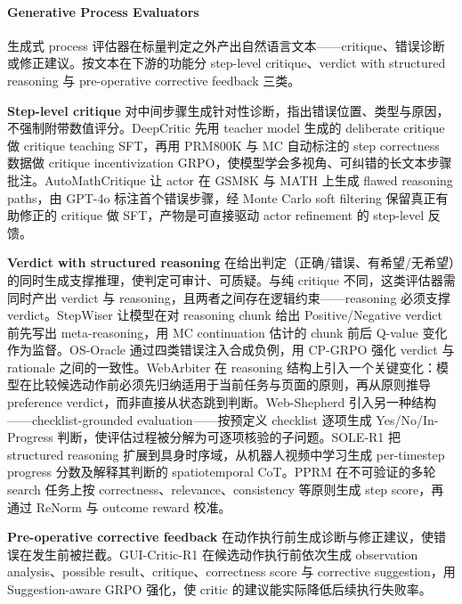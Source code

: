 \paragraph{Generative Process Evaluators}

生成式 process 评估器在标量判定之外产出自然语言文本——critique、错误诊断或修正建议。按文本在下游的功能分 step-level critique、verdict with structured reasoning 与 pre-operative corrective feedback 三类。

\textbf{Step-level critique} 对中间步骤生成针对性诊断，指出错误位置、类型与原因，不强制附带数值评分。DeepCritic \cite{Yan25u} 先用 teacher model 生成的 deliberate critique 做 critique teaching SFT，再用 PRM800K 与 MC 自动标注的 step correctness 数据做 critique incentivization GRPO，使模型学会多视角、可纠错的长文本步骤批注。AutoMathCritique \cite{Xi24} 让 actor 在 GSM8K 与 MATH 上生成 flawed reasoning paths，由 GPT-4o 标注首个错误步骤，经 Monte Carlo soft filtering 保留真正有助修正的 critique 做 SFT，产物是可直接驱动 actor refinement 的 step-level 反馈。

\textbf{Verdict with structured reasoning} 在给出判定（正确/错误、有希望/无希望）的同时生成支撑推理，使判定可审计、可质疑。与纯 critique 不同，这类评估器需同时产出 verdict 与 reasoning，且两者之间存在逻辑约束——reasoning 必须支撑 verdict。StepWiser \cite{Xio25c} 让模型在对 reasoning chunk 给出 Positive/Negative verdict 前先写出 meta-reasoning，用 MC continuation 估计的 chunk 前后 Q-value 变化作为监督。OS-Oracle \cite{Wu25m} 通过四类错误注入合成负例，用 CP-GRPO 强化 verdict 与 rationale 之间的一致性。WebArbiter \cite{Zha26ab} 在 reasoning 结构上引入一个关键变化：模型在比较候选动作前必须先归纳适用于当前任务与页面的原则，再从原则推导 preference verdict，而非直接从状态跳到判断。Web-Shepherd \cite{Cha25b} 引入另一种结构——checklist-grounded evaluation——按预定义 checklist 逐项生成 Yes/No/In-Progress 判断，使评估过程被分解为可逐项核验的子问题。SOLE-R1 \cite{Sch26} 把 structured reasoning 扩展到具身时序域，从机器人视频中学习生成 per-timestep progress 分数及解释其判断的 spatiotemporal CoT。PPRM \cite{Xu25h} 在不可验证的多轮 search 任务上按 correctness、relevance、consistency 等原则生成 step score，再通过 ReNorm 与 outcome reward 校准。

\textbf{Pre-operative corrective feedback} 在动作执行前生成诊断与修正建议，使错误在发生前被拦截。GUI-Critic-R1 \cite{Wan25q} 在候选动作执行前依次生成 observation analysis、possible result、critique、correctness score 与 corrective suggestion，用 Suggestion-aware GRPO 强化，使 critic 的建议能实际降低后续执行失败率。

